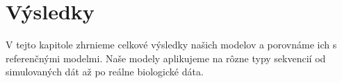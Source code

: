 \chapter{Výsledky}

V tejto kapitole zhrnieme celkové výsledky našich modelov a porovnáme ich s referenčnými modelmi. Naše modely aplikujeme na rôzne typy sekvencií od simulovaných dát až po reálne biologické dáta.










